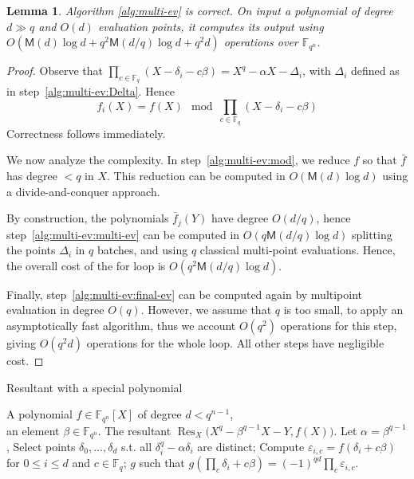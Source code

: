 \documentclass{sig-alternate}
\newcommand{\ff}[1]{\mathbb{F}_{#1}}
\newcommand{\dd}{d}
\newcommand{\qq}{q}
\newcommand{\nn}{n}
\newcommand{\qn}{{\qq^\nn}}
\newcommand{\basef}{\ff{\qq}}
\newcommand{\extf}{\ff{\qn}}
\newcommand{\Mul}{\mathsf{M}}
\DeclareMathOperator{\Res}{Res}
\newcounter{algo}
\newtheorem{Lem}{Lemma}
\begin{document}
\begin{Lem}
  \label{lem:multi-ev}
  Algorithm \ref{alg:multi-ev} is correct. On input a polynomial of
  degree $\dd\gg\qq$ and $O(\dd)$ evaluation points, it computes its
  output using $O(\Mul(\dd) \log\dd + \qq^2\Mul(\dd/\qq)\log\dd +
  \qq^2\dd)$ operations over $\extf$.
\end{Lem}
\begin{proof}
  Observe that
  $\prod_{c\in\basef}(X-\delta_i-c\beta)=X^\qq-\alpha X-\Delta_i$, with
  $\Delta_i$ defined as in step~\ref{alg:multi-ev:Delta}. Hence
  \begin{equation*}
    f_i(X)=f(X)\mod \prod_{c\in\basef}(X-\delta_i-c\beta)
  \end{equation*}
  Correctness follows immediately.

  We now analyze the complexity. In step~\ref{alg:multi-ev:mod}, we
  reduce $f$ so that $\bar{f}$ has degree $<\qq$ in $X$. This
  reduction can be computed in $O(\Mul(d)\log d)$ using a
  divide-and-conquer approach.

  By construction, the polynomials $\bar{f}_j(Y)$ have degree
  $O(\dd/\qq)$, hence step~\ref{alg:multi-ev:multi-ev} can be computed
  in $O(\qq\Mul(\dd/\qq)\log\dd)$ splitting the points $\Delta_i$ in
  $q$ batches, and using $\qq$ classical multi-point
  evaluations. Hence, the overall cost of the for loop is
  $O(\qq^2\Mul(\dd/\qq)\log\dd)$.

  Finally, step~\ref{alg:multi-ev:final-ev} can be computed again by
  multipoint evaluation in degree $O(\qq)$. However, we assume that
  $\qq$ is too small, to apply an asymptotically fast algorithm, thus
  we account $O(\qq^2)$ operations for this step, giving $O(\qq^2\dd)$
  operations for the whole loop. All other steps have negligible cost.
\end{proof}

\begin{algorithm}
  \caption{Resultant with a special polynomial}
  \label{alg:resultant}
  \begin{algorithmic}[1]
    \REQUIRE A polynomial $f\in\extf[X]$ of degree $\dd<\qq^{n-1}$,\\
    an element $\beta\in\extf$.
    \ENSURE The resultant $\Res_X\bigl(X^\qq-\beta^{\qq-1}X-Y,f(X)).$
    \STATE Let $\alpha=\beta^{\qq-1}$,
    \STATE\label{alg:resultant:select} Select points $\delta_0,\dots,\delta_d$ s.t. all $\delta_i^\qq-\alpha\delta_i$ are distinct;
    \STATE\label{alg:resultant:multi-ev} Compute $\varepsilon_{i,c}=f(\delta_i+c\beta)$ for $0\le i\le\dd$ and $c\in\basef$;
    \RETURN\label{alg:resultant:interp} $g$ such that $g\left(\prod_c\delta_i+c\beta\right) = (-1)^{\qq\dd}  \prod_c\varepsilon_{i,c}$.
  \end{algorithmic}
\end{algorithm}
\end{document}
